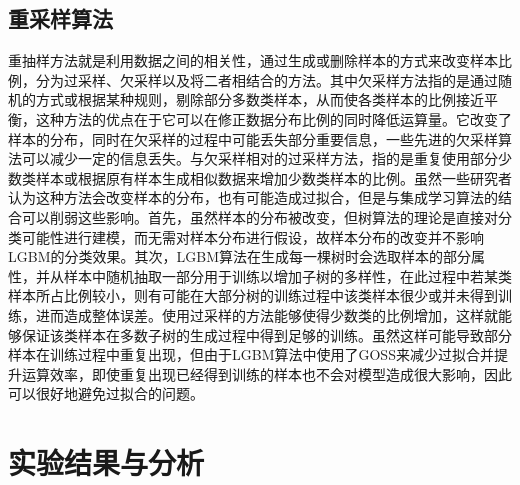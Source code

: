 \documentclass[a4papper]{article}
\begin{document}
\subsection{重采样算法}
\par\setlength{\parindent}{2em} %
重抽样方法就是利用数据之间的相关性，通过生成或删除样本的方式来改变样本比例，分为过采样、欠采样以及将二者相结合的方法。其中欠采样方法指的是通过随机的方式或根据某种规则，剔除部分多数类样本，从而使各类样本的比例接近平衡，这种方法的优点在于它可以在修正数据分布比例的同时降低运算量。它改变了样本的分布，同时在欠采样的过程中可能丢失部分重要信息，一些先进的欠采样算法可以减少一定的信息丢失。与欠采样相对的过采样方法，指的是重复使用部分少数类样本或根据原有样本生成相似数据来增加少数类样本的比例。虽然一些研究者认为这种方法会改变样本的分布，也有可能造成过拟合，但是与集成学习算法的结合可以削弱这些影响。首先，虽然样本的分布被改变，但树算法的理论是直接对分类可能性进行建模，而无需对样本分布进行假设，故样本分布的改变并不影响LGBM的分类效果。其次，LGBM算法在生成每一棵树时会选取样本的部分属性，并从样本中随机抽取一部分用于训练以增加子树的多样性，在此过程中若某类样本所占比例较小，则有可能在大部分树的训练过程中该类样本很少或并未得到训练，进而造成整体误差。使用过采样的方法能够使得少数类的比例增加，这样就能够保证该类样本在多数子树的生成过程中得到足够的训练。虽然这样可能导致部分样本在训练过程中重复出现，但由于LGBM算法中使用了GOSS来减少过拟合并提升运算效率，即使重复出现已经得到训练的样本也不会对模型造成很大影响，因此可以很好地避免过拟合的问题。
\section{实验结果与分析}
\end{document}
